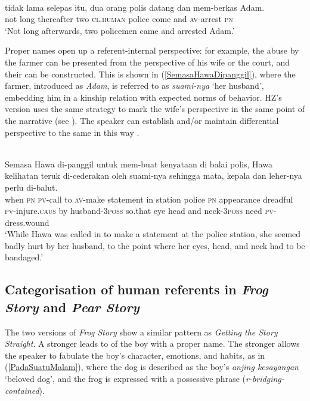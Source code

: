 \documentclass[output=paper
,modfonts
,nonflat]{langsci/langscibook}
\begin{document}
\ea\label{TidakLamaSelepas} 
\\
	\gll tidak lama {selepas itu},  {\ob}dua orang polis{\cb}     datang dan  mem-berkas Adam.\\
		not   long thereafter   two \textsc{cl.human}    police come   and  \textsc{av-}arrest    \textsc{pn}\\
\glt `Not long afterwards, two policemen came and arrested Adam.'
\z

\noindent
Proper names open up a referent-internal perspective: for example, the abuse by the farmer can be presented from the perspective of his wife or the court, and their  can be constructed. This is shown in (\ref{SemasaHawaDipanggil}), where the farmer, introduced as \emph{Adam}, is referred to as \emph{suami-nya} `her husband', embedding him in a kinship relation with expected norms of behavior. HZ's version uses the same strategy to mark the wife's perspective in the same point of the narrative (see ). The speaker can establish and/or maintain differential perspective to the same  in this way \citep[cf.][107]{Enfield2007}.

\ea\label{SemasaHawaDipanggil} 
\\
\gll  Semasa Hawa di-panggil untuk mem-buat kenyataan di balai   polis, Hawa kelihatan teruk di-cederakan            oleh  {\ob}suami-nya{\cb}       sehingga mata, kepala dan  leher-nya     perlu di-balut.\\
when   \textsc{pn}  \textsc{pv-}call      to    \textsc{av-}make    statement in station police \textsc{pn}  appearance   dreadful \textsc{pv-}injure.\textsc{caus}    by   husband-\textsc{3poss} so.that  eye   head   and  neck-\textsc{3poss} need \textsc{pv-}dress.wound\\
\glt `While Hawa was called in to make a statement at the police station, she seemed badly hurt by her husband, to the point where her eyes, head, and neck had to be bandaged.'
\z

\subsection{Categorisation of human referents in \emph{Frog Story} and \emph{Pear Story}}\label{CategorisationHumanFS}
The two versions of \emph{Frog Story} show a similar pattern as \emph{Getting the Story Straight}. A stronger  leads to  of the boy with a proper name. The stronger  allows the speaker to fabulate the boy's character, emotions, and habits, as in (\ref{PadaSuatuMalam}), where the dog is described as the boy's \emph{anjing kesayangan} `beloved dog', and the frog is expressed with a possessive phrase (\emph{r-bridging-contained}).
\end{document}
